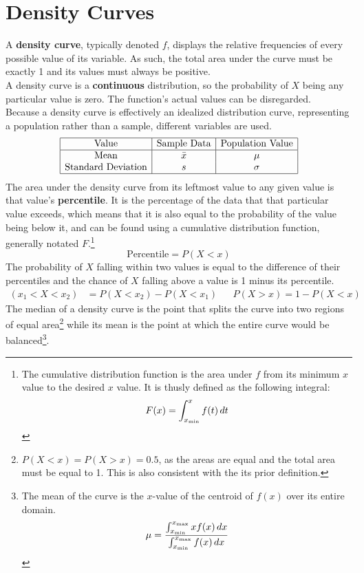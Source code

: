 \documentclass[../AP_Statistics.tex]{subfiles}
\begin{document}
		\section{Density Curves}
			A \textbf{density curve}, typically denoted $f$, displays the relative frequencies of every possible value of its variable. As such, the total area under the curve must be exactly 1 and its values must always be positive. \\ 
			A density curve is a \textbf{continuous} distribution, so the probability of $X$ being any particular value is zero. The function's actual values can be disregarded. \\
			Because a density curve is effectively an idealized distribution curve, representing a population rather than a sample, different variables are used. \\ 
			$$\begin{array}{|c|c|c|}\hline
				\rm{Value} & \text{Sample Data} & \text{Population Value} \\\hline
				\rm{Mean} & \bar{x} & \mu \\
				\text{Standard Deviation} & s & \sigma \\\hline
			\end{array}$$
			The area under the density curve from its leftmost value to any given value is that value's \textbf{percentile}. It is the percentage of the data that that particular value exceeds, which means that it is also equal to the probability of the value being below it, and can be found using a cumulative distribution function, generally notated $F$.\footnote{The cumulative distribution function is the area under $f$ from its minimum $x$ value to the desired $x$ value. It is thusly defined as the following integral:$$F(x) = \int_{x_{\mathrm{min}}}^xf(t)\,dt$$}
			$$\mathrm{Percentile} = P(X < x)$$
			The probability of $X$ falling within two values is equal to the difference of their percentiles and the chance of $X$ falling above a value is 1 minus its percentile.
			\begin{align*}
				(x_1 < X < x_2) &= P(X < x_2) - P(X < x_1) && P(X > x) = 1 - P(X < x)
			\end{align*}
			The median of a density curve is the point that splits the curve into two regions of equal area\footnote{$P(X < x) = P(X > x) = 0.5$, as the areas are equal and the total area must be equal to 1. This is also consistent with the its prior definition.} while its mean is the point at which the entire curve would be balanced\footnote{The mean of the curve is the $x$-value of the centroid of $f(x)$ over its entire domain. $$\mu = \frac{\int_{x_{\mathrm{min}}}^{x_{\mathrm{max}}}xf(x)\,dx}{\int_{x_{\mathrm{min}}}^{x_{\mathrm{max}}}f(x)\,dx}$$}.
\end{document}
